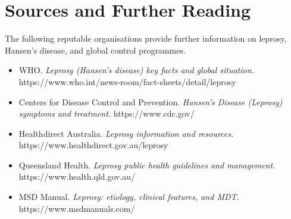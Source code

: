 \section*{Sources and Further Reading}
The following reputable organisations provide further information on leprosy, Hansen's disease, and global control programmes.
\begin{itemize}
    \item WHO. \textit{Leprosy (Hansen's disease) key facts and global situation.} https://www.who.int/news-room/fact-sheets/detail/leprosy
    \item Centers for Disease Control and Prevention. \textit{Hansen's Disease (Leprosy) symptoms and treatment.} https://www.cdc.gov/
    \item Healthdirect Australia. \textit{Leprosy information and resources.} https://www.healthdirect.gov.au/leprosy
    \item Queensland Health. \textit{Leprosy public health guidelines and management.} https://www.health.qld.gov.au/
    \item MSD Manual. \textit{Leprosy: etiology, clinical features, and MDT.} https://www.msdmanuals.com/
\end{itemize}
